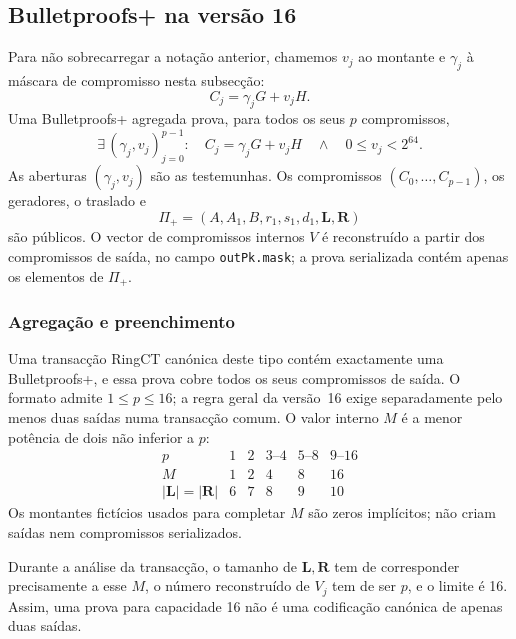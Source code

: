 \subsection{Bulletproofs+ na versão 16}

Para não sobrecarregar a notação anterior, chamemos \(v_j\) ao montante e
\(\gamma_j\) à máscara de compromisso nesta subsecção:
\[
 C_j=\gamma_jG+v_jH.
\]
Uma Bulletproofs+ agregada prova, para todos os seus \(p\) compromissos,
\begin{equation}
 \exists\,(\gamma_j,v_j)_{j=0}^{p-1}:
 \quad C_j=\gamma_jG+v_jH
 \quad\land\quad 0\leq v_j<2^{64}.
 \label{eq:bpp-statement}
\end{equation}
As aberturas \((\gamma_j,v_j)\) são as testemunhas. Os compromissos
\((C_0,\ldots,C_{p-1})\), os geradores, o traslado e
\[
 \Pi_+=(A,A_1,B,r_1,s_1,d_1,
          \boldsymbol L,\boldsymbol R)
\]
são públicos. O vector de compromissos internos \(V\) é reconstruído a partir
dos compromissos de saída, no campo \texttt{outPk.mask}; a prova serializada
contém apenas os elementos de \(\Pi_+\).

\subsubsection*{Agregação e preenchimento}

Uma transacção RingCT canónica deste tipo contém exactamente uma Bulletproofs+,
e essa prova cobre todos os seus compromissos de saída. O formato admite
\(1\leq p\leq16\); a regra geral da versão~16 exige separadamente pelo menos
duas saídas numa transacção comum. O valor interno \(M\) é a menor potência de
dois não inferior a \(p\):
\[
\begin{array}{c|ccccc}
 p&1&2&3\text{--}4&5\text{--}8&9\text{--}16\\ \hline
 M&1&2&4&8&16\\
 \lvert\boldsymbol L\rvert=\lvert\boldsymbol R\rvert
  &6&7&8&9&10
\end{array}
\]
Os montantes fictícios usados para completar \(M\) são zeros implícitos; não
criam saídas nem compromissos serializados.

%
Durante a análise da transacção, o tamanho de
\(\boldsymbol L,\boldsymbol R\) tem de corresponder precisamente a esse
\(M\), o número reconstruído de \(V_j\) tem de ser \(p\), e o limite é 16.
Assim, uma prova para capacidade 16 não é uma codificação canónica de apenas
duas saídas.


